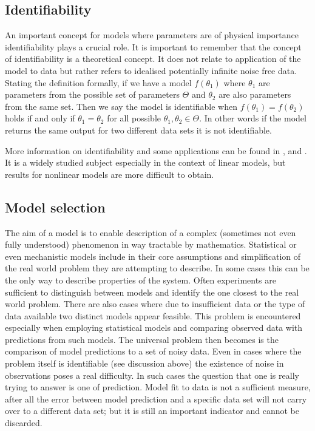 \subsection{Identifiability}
\label{sec:identifiability-back}

An important concept for models where parameters are of physical importance identifiability plays a crucial role. It is important to remember that the concept of identifiability is a theoretical concept. It does not relate to application of the model to data but rather refers to idealised potentially infinite noise free data. Stating the definition formally, if we have a model $f(\theta_1)$ where $\theta_1$ are parameters from the possible set of parameters $\Theta$ and $\theta_2$ are also parameters from the same set. Then we say the model is identifiable when $f(\theta_1) = f(\theta_2)$ holds if and only if $\theta_1 = \theta_2$ for all possible $\theta_1, \theta_2 \in \Theta$. In other words if the model returns the same output for two different data sets it is not identifiable.

More information on identifiability and some applications can be found in \cite{Saccomani:2003kx},  \cite{Saccomani:2010by} and \cite{Jacquez:1985fz}. It is a widely studied subject especially in the context of linear models, but results for nonlinear models are more difficult to obtain. 

\subsection{Model selection}
\label{sec:model-selection-1}

The aim of a model is to enable description of a complex (sometimes not even fully understood) phenomenon in way tractable by mathematics. Statistical or even mechanistic models include in their core assumptions and simplification of the real world problem they are attempting to describe. In some cases this can be the only way to describe properties of the system. Often experiments are sufficient to distinguish between models and identify the one closest to the real world problem. There are also cases where due to insufficient data or the type of data available two distinct models appear feasible. This problem is encountered especially when employing statistical models and comparing observed data with predictions from such models. The universal problem then becomes is the comparison of model predictions to a set of noisy data. Even in cases where the problem itself is identifiable (see discussion above) the existence of noise in observations poses a real difficulty. In such cases the question that one is really trying to answer is one of prediction. Model fit to data is not a sufficient measure, after all the error between model prediction and a specific data set will not carry over to a different data set; but it is still an important indicator and cannot be discarded. 

